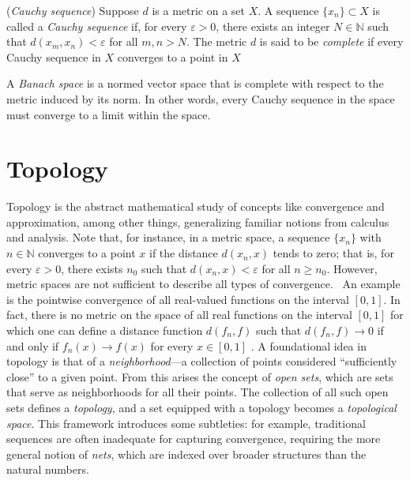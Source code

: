 \begin{definition} (\emph{Cauchy sequence})
  Suppose $ d $ is a metric on a set $ X $. A sequence $ \{x_n\} \subset X $ is called a \emph{Cauchy sequence} if, for every $ \varepsilon > 0 $, there exists an integer $N \in \mathbb{N} $ such that $ d(x_m, x_n) < \varepsilon $ for all $ m, n > N $.  The metric \( d \) is said to be \emph{complete} if every Cauchy sequence in \( X \) converges to a point in \( X \)
\end{definition}

\begin{definition}
  A \emph{Banach space} is a normed vector space that is complete with respect to the metric induced by its norm. In other words, every Cauchy sequence in the space must converge to a limit within the space.
\end{definition}


\section{Topology}



Topology is the abstract mathematical study of concepts like convergence and approximation, among other things, generalizing familiar notions from calculus and analysis. 
Note that, for instance, in a metric space, a sequence $\{x_n\}$ with $n \in \mathbb{N}$ converges to a point $x$ if the distance $d(x_n, x)$ tends to zero; that is, for every $\varepsilon > 0$, there exists $n_0$ such that $d(x_n, x) < \varepsilon$ for all $n \geq n_0$. However, metric spaces are not sufficient to describe all types of convergence.  An example is the pointwise convergence of all real-valued functions on the interval $[0, 1]$. In fact, there is no metric on the space of all real functions on the interval $[0,1]$ for which one can define a distance function $d(f_n, f)$ such that $d(f_n, f) \to 0$ if and only if $f_n(x) \to f(x)$ for every $x \in [0, 1]$ \cite{guide2006infinite}. 
A foundational idea in topology is that of a \emph{neighborhood}—a collection of points considered ``sufficiently close'' to a given point. From this arises the concept of \emph{open sets}, which are sets that serve as neighborhoods for all their points. The collection of all such open sets defines a \emph{topology}, and a set equipped with a topology becomes a \emph{topological space}. This framework introduces some subtleties: for example, traditional sequences are often inadequate for capturing convergence, requiring the more general notion of \emph{nets}, which are indexed over broader structures than the natural numbers.

